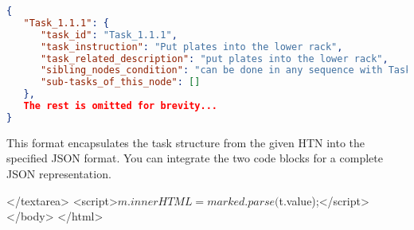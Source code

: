 \begin{tcolorbox}[breakable,title=Dialog 2: Generating JSON file]
\begin{lstlisting}[language=JSON]
{
   "Task_1.1.1": {
      "task_id": "Task_1.1.1",
      "task_instruction": "Put plates into the lower rack",
      "task_related_description": "put plates into the lower rack",
      "sibling_nodes_condition": "can be done in any sequence with Task_1.1.2 and Task_1.1.3",
      "sub-tasks_of_this_node": []
   },
   The rest is omitted for brevity...
}
\end{lstlisting}
This format encapsulates the task structure from the given HTN into the specified JSON format. You can integrate the two code blocks for a complete JSON representation.
\end{tcolorbox}

  </textarea>
  <script>$m.innerHTML = marked.parse($t.value);</script>
</body>
</html>
